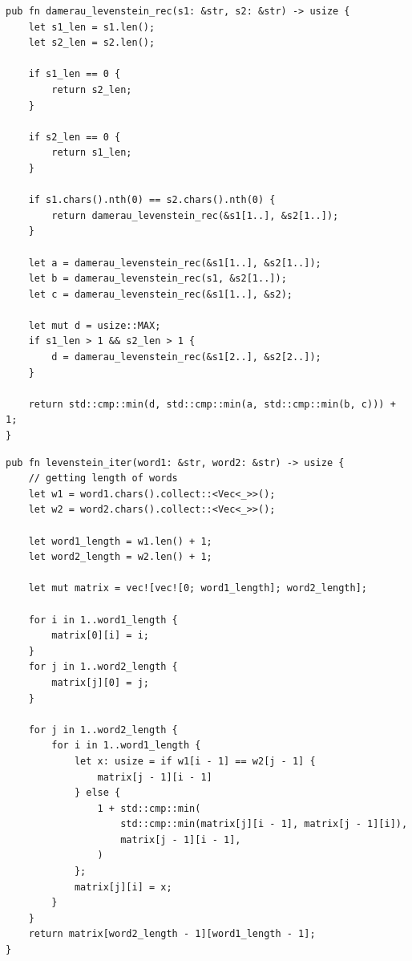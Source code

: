 \documentclass[12pt]{report}
\begin{document}
\newpage

\begin{lstlisting}[label=some-code,caption=Функция нахождения расстояния Дамерау-Левенштейна рекурсивно]
pub fn damerau_levenstein_rec(s1: &str, s2: &str) -> usize {
	let s1_len = s1.len();
	let s2_len = s2.len();

	if s1_len == 0 {
		return s2_len;
	}

	if s2_len == 0 {
		return s1_len;
	}   

	if s1.chars().nth(0) == s2.chars().nth(0) {
		return damerau_levenstein_rec(&s1[1..], &s2[1..]);
	}

	let a = damerau_levenstein_rec(&s1[1..], &s2[1..]);
	let b = damerau_levenstein_rec(s1, &s2[1..]);
	let c = damerau_levenstein_rec(&s1[1..], &s2);

	let mut d = usize::MAX;
	if s1_len > 1 && s2_len > 1 {
		d = damerau_levenstein_rec(&s1[2..], &s2[2..]);
	}

	return std::cmp::min(d, std::cmp::min(a, std::cmp::min(b, c))) + 1;
}

\end{lstlisting}

\newpage

\begin{lstlisting}[label=some-code,caption=Функция нахождения расстояния Левенштейна матрично]
pub fn levenstein_iter(word1: &str, word2: &str) -> usize {
	// getting length of words
	let w1 = word1.chars().collect::<Vec<_>>();
	let w2 = word2.chars().collect::<Vec<_>>();

	let word1_length = w1.len() + 1;
	let word2_length = w2.len() + 1;

	let mut matrix = vec![vec![0; word1_length]; word2_length];

	for i in 1..word1_length {
		matrix[0][i] = i;
	}
	for j in 1..word2_length {
		matrix[j][0] = j;
	}

	for j in 1..word2_length {
		for i in 1..word1_length {
			let x: usize = if w1[i - 1] == w2[j - 1] {
				matrix[j - 1][i - 1]
			} else {
				1 + std::cmp::min(
					std::cmp::min(matrix[j][i - 1], matrix[j - 1][i]),
					matrix[j - 1][i - 1],
				)
			};
			matrix[j][i] = x;
		}
	}
	return matrix[word2_length - 1][word1_length - 1];
}
\end{lstlisting}

\newpage
\end{document}
